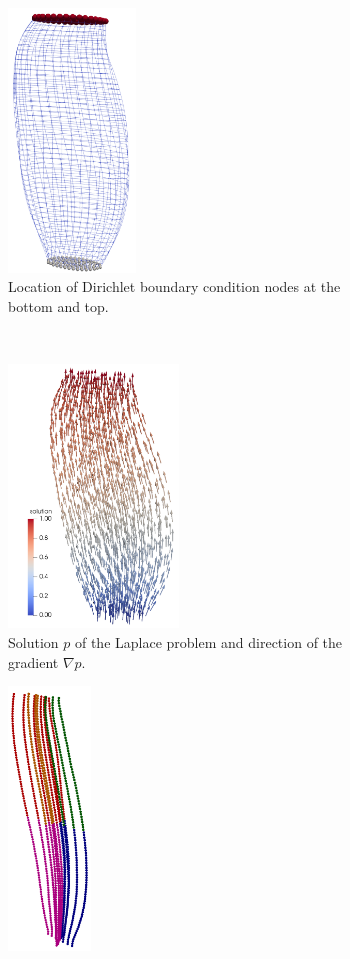 \begin{figure}
  \centering
  \begin{subfigure}[t]{0.23\textwidth}%
    \centering%
    \includegraphics[height=7cm]{images/parallel_fiber_estimation/dirichlet_bc_1.png}
    \caption{Location of Dirichlet boundary condition nodes at the bottom and top.}%
    \label{fig:dirichlet_bc_1}%
  \end{subfigure}
  \,
  \begin{subfigure}[t]{0.24\textwidth}%
    \centering%
    \includegraphics[height=7cm]{images/parallel_fiber_estimation/laplace_1.png}
    \caption{Solution $p$ of the Laplace problem and direction of the gradient $\nabla p$.}%
    \label{fig:laplace_1}%
  \end{subfigure}
  \qquad
  \begin{subfigure}[t]{0.19\textwidth}%
    \centering%
    \includegraphics[height=7cm]{images/parallel_fiber_estimation/boundary_points_1.png}

\end{subfigure}
\end{figure}
